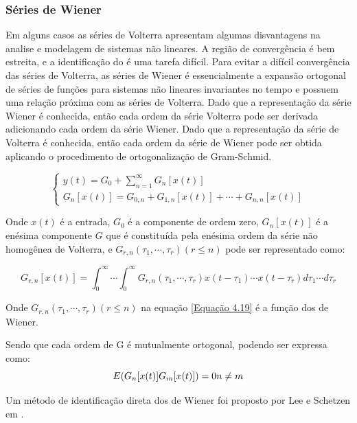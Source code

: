 \subsubsection*{Séries de Wiener}
Em alguns casos as séries de Volterra apresentam algumas disvantagens na analise e modelagem de sistemas não lineares. A região de convergência é bem estreita, e a identificação do  é uma tarefa difícil. Para evitar a difícil convergência das séries de Volterra, as séries de Wiener é essencialmente a expansão ortogonal de séries de funções para sistemas não lineares invariantes no tempo e possuem uma relação próxima com as séries de Volterra. Dado que a representação da série Wiener é conhecida, então cada ordem da série Volterra pode ser derivada adicionando cada ordem da série Wiener.
Dado que a representação da série de Volterra é conhecida, então cada ordem da série de Wiener pode ser obtida aplicando o procedimento de ortogonalização de Gram-Schmid.

\begin{equation}
\left\{\begin{array}{ll}y(t) = G_{0} + \sum_{n = 1}^{\infty} G_{n}[x(t)]\\G_{n}[x(t)] = G_{0,n} + G_{1,n}[x(t)]+ \cdots + G_{n,n}[x(t)]\end{array}\right.
\label{Equação 4.18}
\end{equation}

Onde $x(t)$ é a entrada, $G_{0}$ é a componente de ordem zero, $G_{n}[x(t)]$ é a enésima componente $G$ que é constituída pela enésima ordem da série não homogênea de Volterra, e $G_{r,n}(\tau_{1},\cdots,\tau_{r})(r \leq n)$ pode ser representado como:

\begin{equation}
G_{r,n}[x(t)] = \int_{0}^{\infty} \cdots \int_{0}^{\infty} G_{r,n}(\tau_{1},\cdots,\tau_{r})x(t-\tau_{1})\cdots x(t - \tau_{r})d\tau_{1}\cdots d\tau_{r}
\label{Equação 4.19}
\end{equation}

Onde $G_{r,n}(\tau_{1},\cdots,\tau_{r})(r \leq n)$ na equação \ref{Equação 4.19} é a função dos  de Wiener.

Sendo que cada ordem de G é mutualmente ortogonal, podendo ser expressa como:
\begin{equation}
E(G_{n}[x(t)]G_{m}[x(t)]) = 0$$
$$n \neq m 
\end{equation}


Um método de identificação direta dos  de Wiener foi proposto por Lee e Schetzen em \cite{lee1965measurement}.

